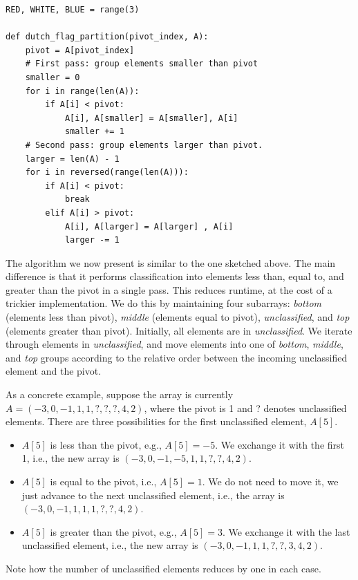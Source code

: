 \documentclass[11pt,a4paper]{article}
\begin{document}
\begin{verbatim}
RED, WHITE, BLUE = range(3)

def dutch_flag_partition(pivot_index, A):
    pivot = A[pivot_index]
    # First pass: group elements smaller than pivot
    smaller = 0
    for i in range(len(A)):
        if A[i] < pivot:
            A[i], A[smaller] = A[smaller], A[i] 
            smaller += 1
    # Second pass: group elements larger than pivot.
    larger = len(A) - 1
    for i in reversed(range(len(A))):
        if A[i] < pivot: 
            break
        elif A[i] > pivot:
            A[i], A[larger] = A[larger] , A[i]
            larger -= 1
\end{verbatim}

The algorithm we now present is similar to the one sketched above. The main
difference is that it performs classification into elements less than, equal
to, and greater than the pivot in a single pass. This reduces runtime, at the
cost of a trickier implementation. We do this by maintaining four subarrays:
\emph{bottom} (elements less than pivot), \emph{middle} (elements equal to
pivot), \emph{unclassified}, and \emph{top} (elements greater than pivot).
Initially, all elements are in \emph{unclassified}. We iterate through
elements in \emph{unclassified}, and move elements into one of \emph{bottom},
\emph{middle}, and \emph{top} groups according to the relative order between
the incoming unclassified element and the pivot.

As a concrete example, suppose the array is currently $A =
(-3,0,-1,1,1,?,?,?,4,2)$, where the pivot is 1 and ? denotes unclassified
elements. There are three possibilities for the first unclassified element,
$A[5]$.
\begin{itemize}
  \item $A[5]$ is less than the pivot, e.g., $A[5] = -5$. We exchange it with
    the first 1, i.e., the new array is $(-3, 0, -1, -5, 1, 1, ?, ?, 4, 2)$. 
  \item $A[5]$ is equal to the pivot, i.e., $A[5] = 1$. We do not need to move
    it, we just advance to the next unclassified element, i.e., the array is
    $(-3,0,-1,1,1,1,?,?,4,2)$. 
  \item $A[5]$ is greater than the pivot, e.g., $A[5] = 3$. We exchange it 
    with the last unclassified element, i.e., the new array is 
    $(-3,0,-1,1,1,?,?,3,4,2)$. 
\end{itemize}
    
Note how the number of unclassified elements reduces by one in each case.
\end{document}

